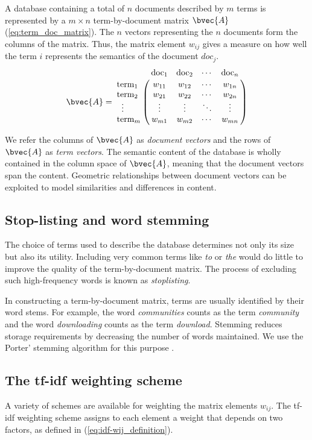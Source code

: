 A database containing a total of $n$ documents described by $m$ terms is represented by a $m \times n$ term-by-document matrix $\bvec{A}$ (\ref{eq:term_doc_matrix}). The $n$ vectors representing the $n$ documents form the columns of the matrix. Thus, the matrix element $w_{ij}$ gives a measure on how well the term $i$ represents the semantics of the document $doc_j$.
\begin{equation}\label{eq:term_doc_matrix}
\bvec{A} = 
\bordermatrix{
  & \mbox{doc}_1   & \mbox{doc}_2      & \cdots & \mbox{doc}_n \cr
\mbox{term}_1      & w_{11} & w_{12} & \cdots & w_{1n} \cr
\mbox{term}_2      & w_{21} & w_{22} & \cdots & w_{2n} \cr
  \; \;     \vdots      & \vdots & \vdots & \ddots & \vdots \cr
\mbox{term}_m      & w_{m1} & w_{m2} & \cdots & w_{mn} \cr}
\end{equation}

We refer the columns of $\bvec{A}$ as \emph{document vectors} and the rows of $\bvec{A}$ as \emph{term vectors}. The semantic content of the database is wholly contained in the column space of $\bvec{A}$, meaning that the document vectors span the content. Geometric relationships between document vectors can be exploited to model similarities and differences in content.

\subsection{Stop-listing and word stemming}
The choice of terms used to describe the database determines not only its size but also its utility. Including very common terms like \emph{to} or \emph{the} would do little to improve the quality of the term-by-document matrix. The process of excluding such high-frequency words is known as \emph{stoplisting}.

In constructing a term-by-document matrix, terms are usually identified by their word stems. For example, the word \emph{communities} counts as the term \emph{community} and the word \emph{downloading} counts as the term \emph{download}. Stemming reduces storage requirements by decreasing the number of words maintained. We use the Porter' stemming algorithm for this purpose \cite{POR97}.


\subsection{\label{subsec:tfidf}The tf-idf weighting scheme}
A variety of schemes are available for weighting the matrix elements $w_{ij}$. The tf-idf weighting scheme assigns to each element a weight that depends on two factors, as defined in (\ref{eq:idf-wij_definition}).

